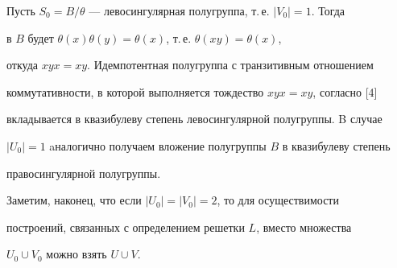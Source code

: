 \begin{pf}
Пусть $S_0=B/\theta$ --- левосингулярная полугруппа, т.\,е. $|V_0|=1$. Тогда


в $B$ будет $\theta(x)\theta(y)=\theta(x)$, т.\,е. $\theta(xy)=\theta(x)$,


откуда $xyx=xy$. Идемпотентная полугруппа с транзитивным отношением


коммутативности, в которой выполняется тождество $xyx=xy$, согласно [4]


вкладывается в квазибулеву степень левосингулярной полугруппы. B случае


$|U_0|=1$ aналогично получаем вложение полугруппы $B$ в квазибулеву степень


правосингулярной полугруппы.





Заметим, наконец, что если $|U_0|=|V_0|=2$, то для осуществимости


построений, связанных с определением решетки $L$, вместо множества


$U_0\cup V_0$ можно взять $U\cup V$.


\end{pf}






